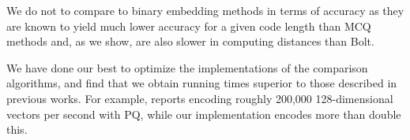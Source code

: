 

We do not to compare to binary embedding methods in terms of accuracy as they are known to yield much lower accuracy for a given code length than MCQ methods \cite{hashingSimilaritySurvey, opq} and, as we show, are also slower in computing distances than Bolt. %

We have done our best to optimize the implementations of the comparison algorithms, and find that we obtain running times superior to those described in previous works. For example, \cite{stackedQuantizers} reports encoding roughly 200,000 128-dimensional vectors per second with PQ, while our implementation encodes more than double this. %

